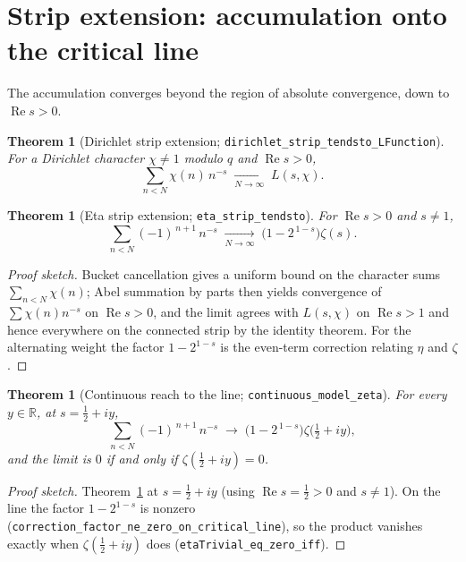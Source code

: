 \documentclass[11pt]{article}
\newtheorem{theorem}[definition]{Theorem}
\DeclareMathOperator{\Ree}{Re}
\newcommand{\R}{\mathbb{R}}
\newcommand{\code}[1]{\texttt{#1}}
\begin{document}
\section{Strip extension: accumulation onto the critical line}\label{sec:strip}

The accumulation converges beyond the region of absolute convergence, down to $\Ree s>0$.

\begin{theorem}[Dirichlet strip extension; \code{dirichlet\_strip\_tendsto\_LFunction}]\label{thm:dstrip}
For a Dirichlet character $\chi\neq 1$ modulo $q$ and $\Ree s>0$,
\[
  \sum_{n<N}\chi(n)\,n^{-s}\;\xrightarrow[N\to\infty]{}\;L(s,\chi).
\]
\end{theorem}

\begin{theorem}[Eta strip extension; \code{eta\_strip\_tendsto}]\label{thm:etastrip}
For $\Ree s>0$ and $s\neq 1$,
\[
  \sum_{n<N}(-1)^{\,n+1}\,n^{-s}\;\xrightarrow[N\to\infty]{}\;\bigl(1-2^{\,1-s}\bigr)\zeta(s).
\]
\end{theorem}

\begin{proof}[Proof sketch]
Bucket cancellation gives a uniform bound on the character sums $\sum_{n<N}\chi(n)$; Abel summation
by parts \cite{Apostol1976,Titchmarsh1986} then yields convergence of $\sum\chi(n)n^{-s}$ on
$\Ree s>0$, and the limit agrees with
$L(s,\chi)$ on $\Ree s>1$ and hence everywhere on the connected strip by the identity theorem. For
the alternating weight the factor $1-2^{1-s}$ is the even-term correction relating $\eta$ and $\zeta$.
\end{proof}

\begin{theorem}[Continuous reach to the line; \code{continuous\_model\_zeta}]\label{thm:cont}
For every $y\in\R$, at $s=\tfrac12+iy$,
\[
  \sum_{n<N}(-1)^{\,n+1}\,n^{-s}\;\longrightarrow\;\bigl(1-2^{\,1-s}\bigr)\zeta\!\bigl(\tfrac12+iy\bigr),
\]
and the limit is $0$ if and only if $\zeta(\tfrac12+iy)=0$.
\end{theorem}

\begin{proof}[Proof sketch]
Theorem~\ref{thm:etastrip} at $s=\tfrac12+iy$ (using $\Ree s=\tfrac12>0$ and $s\neq1$). On the line
the factor $1-2^{1-s}$ is nonzero (\code{correction\_factor\_ne\_zero\_on\_critical\_line}), so the
product vanishes exactly when $\zeta(\tfrac12+iy)$ does (\code{etaTrivial\_eq\_zero\_iff}).
\end{proof}
\end{document}
